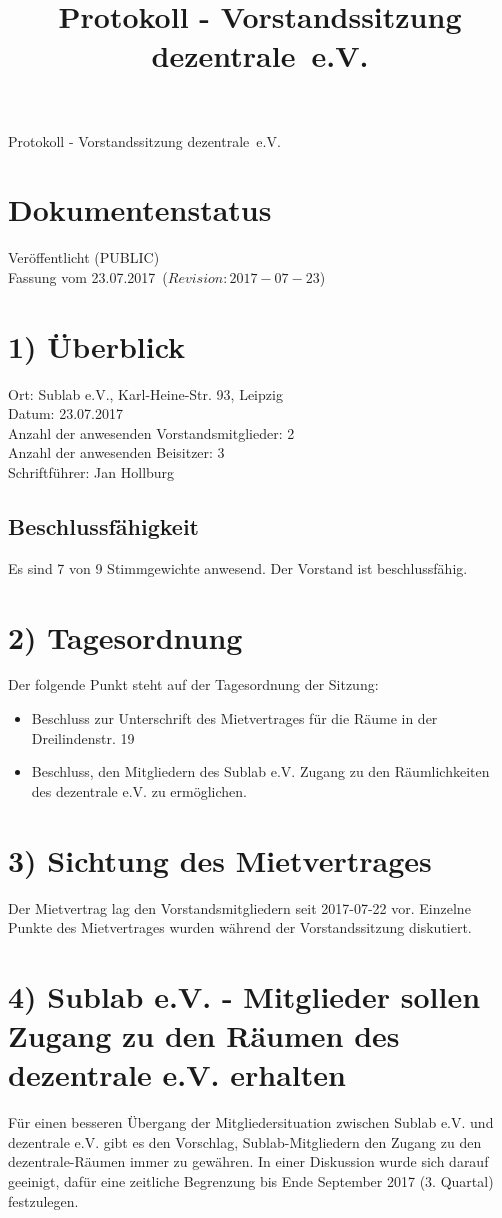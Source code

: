 \documentclass[10pt,a4paper]{scrartcl}
\newcommand{\qs}[1]{\glqq#1\grqq}
\newcommand{\name}{dezentrale}
\newcommand{\revision}{$Revision: 2017-07-23$}
\newcommand{\eventdate}{23.07.2017}
\newcommand{\schriftfuehrer}{Jan Hollburg}
\newcommand{\documentstatus}{Ver{\"o}ffentlicht (PUBLIC)}
\begin{document}
\title{Protokoll - Vorstandssitzung \qs{\name\ e.V.}}
{\LARGE Protokoll - Vorstandssitzung \qs{\name\ e.V.}}

\section*{Dokumentenstatus}
\documentstatus\\
Fassung vom \eventdate\ (\revision)

\section*{1) {\"U}berblick}
    Ort: Sublab e.V., Karl-Heine-Str. 93, Leipzig\\
    Datum: \eventdate\\
    Anzahl der anwesenden Vorstandsmitglieder: 2\\
    Anzahl der anwesenden Beisitzer: 3\\
    Schriftf{\"u}hrer: \schriftfuehrer
\subsection*{Beschlussf{\"a}higkeit}
    Es sind 7 von 9 Stimmgewichte anwesend. Der Vorstand ist beschlussf{\"a}hig.

\section*{2) Tagesordnung}
    Der folgende Punkt steht auf der Tagesordnung der Sitzung:
	\begin{itemize}
        \item Beschluss zur Unterschrift des Mietvertrages für die Räume in der \qs{Dreilindenstr. 19}
		\item Beschluss, den Mitgliedern des Sublab e.V. Zugang zu den R{\"a}umlichkeiten des dezentrale e.V. zu erm{\"o}glichen.
    \end{itemize}

\section*{3) Sichtung des Mietvertrages}
	Der Mietvertrag lag den Vorstandsmitgliedern seit 2017-07-22 vor. Einzelne Punkte
	des Mietvertrages wurden w{\"a}hrend der Vorstandssitzung diskutiert.

\section*{4) Sublab e.V. - Mitglieder sollen Zugang zu den R{\"a}umen des dezentrale e.V. erhalten}
	F{\"u}r einen besseren {\"U}bergang der Mitgliedersituation zwischen Sublab e.V. und dezentrale e.V. gibt es den Vorschlag,
	Sublab-Mitgliedern den Zugang zu den dezentrale-R{\"a}umen immer zu gew{\"a}hren.
	In einer Diskussion wurde sich darauf geeinigt, daf{\"u}r eine zeitliche Begrenzung bis Ende September 2017 (3. Quartal) festzulegen.
\end{document}
